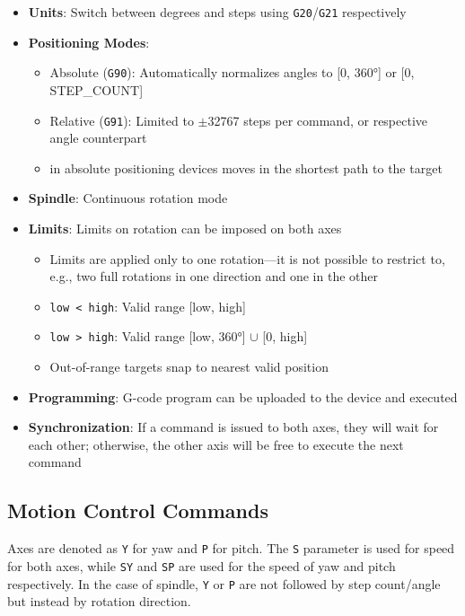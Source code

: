\begin{itemize}
  \item \textbf{Units}: Switch between degrees and steps using \texttt{G20}/\texttt{G21} respectively
  \item \textbf{Positioning Modes}:
    \begin{itemize}
      \item Absolute (\texttt{G90}): Automatically normalizes angles to [0, 360°] or [0, STEP\_COUNT]
      \item Relative (\texttt{G91}): Limited to $\pm$32767 steps per command, or respective angle counterpart
      \item in absolute positioning devices moves in the shortest path to the target
    \end{itemize}
  \item \textbf{Spindle}: Continuous rotation mode
  \item \textbf{Limits}: Limits on rotation can be imposed on both axes
    \begin{itemize}
      \item Limits are applied only to one rotation—it is not possible to restrict to, e.g., two full rotations in one direction and one in the other
      \item \texttt{low < high}: Valid range [low, high]
      \item \texttt{low > high}: Valid range [low, 360°] $\cup$ [0, high]
      \item Out-of-range targets snap to nearest valid position
    \end{itemize}
  \item \textbf{Programming}: G-code program can be uploaded to the device and executed
  \item \textbf{Synchronization}: If a command is issued to both axes, they will wait for each other; otherwise, the other axis will be free to execute the next command
\end{itemize}
\newpage

\subsection*{Motion Control Commands}

Axes are denoted as \texttt{Y} for yaw and \texttt{P} for pitch. The \texttt{S} parameter is used for speed for both axes, while \texttt{SY} and \texttt{SP} are used for the speed of yaw and pitch respectively. In the case of spindle, \texttt{Y} or \texttt{P} are not followed by step count/angle but instead by rotation direction.

